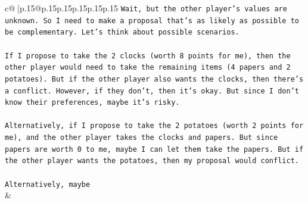 \documentclass{article}
\begin{document}
{\begin{supertabular}{c@{$\;$}|p{.15\linewidth}@{}p{.15\linewidth}p{.15\linewidth}p{.15\linewidth}p{.15\linewidth}p{.15\linewidth}}
{{{\texttt{Wait, but the other player's values are unknown. So I need to make a proposal that's as likely as possible to be complementary. Let's think about possible scenarios.} \\
\\ 
\texttt{If I propose to take the 2 clocks (worth 8 points for me), then the other player would need to take the remaining items (4 papers and 2 potatoes). But if the other player also wants the clocks, then there's a conflict. However, if they don't, then it's okay. But since I don't know their preferences, maybe it's risky.} \\
\\ 
\texttt{Alternatively, if I propose to take the 2 potatoes (worth 2 points for me), and the other player takes the clocks and papers. But since papers are worth 0 to me, maybe I can let them take the papers. But if the other player wants the potatoes, then my proposal would conflict.} \\
\\ 
\texttt{Alternatively, maybe} \\
            }
        }
    }
    & \\ \\


\end{supertabular}}
\end{document}
